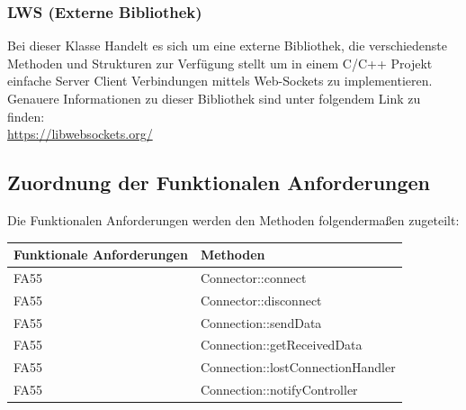     \subsubsection{LWS (Externe Bibliothek)}
		Bei dieser Klasse Handelt es sich um eine externe Bibliothek, die verschiedenste Methoden und Strukturen zur Verfügung stellt um in einem C/C++ Projekt einfache Server Client Verbindungen mittels Web-Sockets zu implementieren. Genauere Informationen zu dieser Bibliothek sind unter folgendem Link zu finden: \\ \url{https://libwebsockets.org/}

\subsection{Zuordnung der Funktionalen Anforderungen}

Die Funktionalen Anforderungen werden den Methoden folgendermaßen zugeteilt:

\begin{table}[h]
	\centering
	\begin{tabular}{|l|l|}
    	\hline
    	\textbf{Funktionale Anforderungen} & \textbf{Methoden} \\ \hline
		FA55 & Connector::connect \\ \hline
    	FA55 & Connector::disconnect \\ \hline    	
    	FA55 & Connection::sendData \\ \hline
    	FA55 & Connection::getReceivedData \\ \hline
    	FA55 & Connection::lostConnectionHandler \\ \hline
    	FA55 & Connection::notifyController \\ \hline

	\end{tabular}
\end{table}